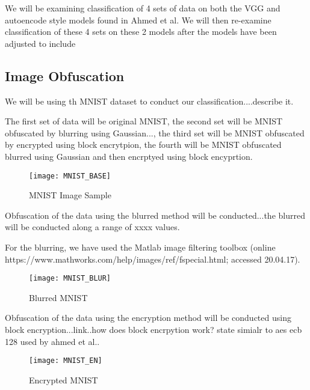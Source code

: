 \documentclass[12pt, titlepage]{article}
\begin{document}
We will be examining classification of 4 sets of data on both the VGG and autoencode style models found in Ahmed et al. We will then re-examine classification of these 4 sets on these 2 models after the models have been adjusted to include 


\subsection{Image Obfuscation}
We will be using th MNIST dataset to conduct our classification....describe it.

The first set of data will be original MNIST, the second set will be MNIST obfuscated by blurring using Gaussian..., the third set will be MNIST obfuscated by encrypted using block encrytpion, the fourth will be MNIST obfuscated blurred using Gaussian and then encrptyed using block encyprtion. 

\begin{figure}[h!]
	\begin{center}
		\texttt{[image: MNIST\_BASE]}
		\caption{MNIST Image Sample}
		\label{MNIST_BASE}
	\end{center}
\end{figure}


Obfuscation of the data using the blurred method will be conducted...the blurred will be conducted along a range of xxxx values.  

 For the blurring, we have used the Matlab image filtering toolbox (online https://www.mathworks.com/help/images/ref/fspecial.html; accessed 20.04.17). 
 
 
 \begin{figure}[h!]
 	\begin{center}
 		\texttt{[image: MNIST\_BLUR]}
 		\caption{Blurred MNIST}
 		\label{MNIST_BLURRED}
 	\end{center}
 \end{figure}

 
 Obfuscation of the data using the encryption method will be conducted using block encryption...link..how does block encrpytion work? state simialr to aes ecb 128 used by ahmed et al..
 
\begin{figure}[h!]
	\begin{center}
		\texttt{[image: MNIST\_EN]}
		\caption{Encrypted MNIST}
		\label{MNIST_ENCRYPTED}
	\end{center}
\end{figure}
\end{document}
